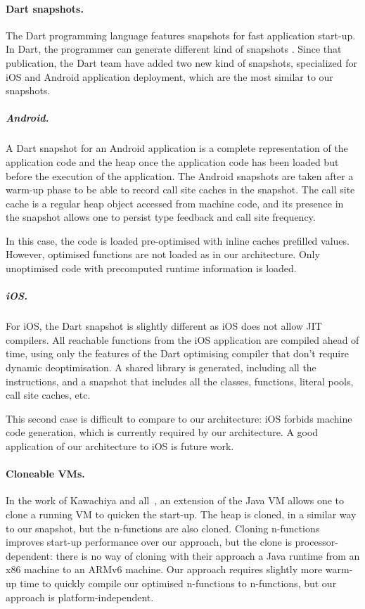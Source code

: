\documentclass[a4paper,12pt,twoside]{../includes/ThesisStyle}
\begin{document}
\paragraph{Dart snapshots.}

The Dart programming language features snapshots for fast application start-up. In Dart, the programmer can generate different kind of snapshots \cite{Anna13a}. Since that publication, the Dart team have added two new kind of snapshots, specialized for iOS and Android application deployment, which are the most similar to our snapshots.

\subparagraph{Android.} A Dart snapshot for an Android application is a complete representation of the application code and the heap once the application code has been loaded but before the execution of the application. The Android snapshots are taken after a warm-up phase to be able to record call site caches in the snapshot. The call site cache is a regular heap object accessed from machine code, and its presence in the snapshot allows one to persist type feedback and call site frequency.

In this case, the code is loaded pre-optimised with inline caches prefilled values. However, optimised functions are not loaded as in our architecture. Only unoptimised code with precomputed runtime information is loaded.

\subparagraph{iOS.} For iOS, the Dart snapshot is slightly different as iOS does not allow JIT compilers. All reachable functions from the iOS application are compiled ahead of time, using only the features of the Dart optimising compiler that don't require dynamic deoptimisation. A shared library is generated, including all the instructions, and a snapshot that includes all the classes, functions, literal pools, call site caches, etc.

This second case is difficult to compare to our architecture: iOS forbids machine code generation, which is currently required by our architecture. A good application of our architecture to iOS is future work.

\paragraph{Cloneable VMs.}

In the work of Kawachiya and all~\cite{Kawa07a}, an extension of the Java VM allows one to clone a running VM to quicken the start-up. The heap is cloned, in a similar way to our snapshot, but the n-functions are also cloned. Cloning n-functions improves start-up performance over our approach, but the clone is processor-dependent: there is no way of cloning with their approach a Java runtime from an x86 machine to an ARMv6 machine. Our approach requires slightly more warm-up time to quickly compile our optimised n-functions to n-functions, but our approach is platform-independent.
\end{document}
